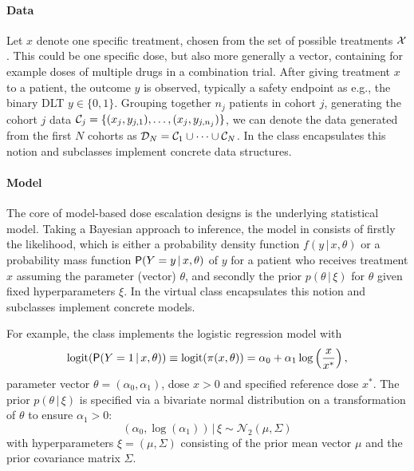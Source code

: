 \documentclass[article]{jss}\usepackage[]{graphicx}\usepackage[]{color}
\newcommand{\given}{\,\vert\,}
\begin{document}
\paragraph{Data}
\label{sec:frame:data}
%
Let $x$ denote one specific treatment, chosen from the set
of possible treatments ${\cal X}$. This could be one specific dose, but also
more generally a vector, containing for example doses of multiple drugs in a
combination trial. After giving treatment $x$ to a patient, the outcome $y$
is observed, typically a safety endpoint as e.g., the binary DLT $y \in \{0,
1\}$. Grouping together $n_{j}$ patients in cohort $j$, generating the cohort
$j$ data ${\cal C}_{j} = \{(x_{j}, y_{j,1}), \dotsc, (x_{j},
y_{j,n_{j}})\}$, we can denote the data generated from the first $N$ cohorts as
${\cal D}_{N}= {\cal C}_{1} \cup \dotsb \cup {\cal C}_{N}$.
%
In  the  class  encapsulates this
notion and subclasses implement concrete data structures.

\paragraph{Model}
\label{sec:frame:model}
%
The core of model-based dose escalation designs is the underlying statistical model. Taking a
Bayesian approach to inference, the model in  consists of firstly the
likelihood, which is either a probability density function $f(y \given x,
\theta)$ or a probability mass function $\Prob(Y=y \given x, \theta)$ of $y$ for
a patient who receives treatment $x$ assuming the parameter (vector) $\theta$,
and secondly the prior $p(\theta \given \xi)$ for $\theta$ given fixed
hyperparameters $\xi$.
%
In  the virtual  class  encapsulates this
notion and subclasses implement concrete models.

For example, the class  implements
the logistic regression model \citep{Neuenschwander2008} with
\begin{equation}
\label{eq:LogisticLogNormal}
\mathrm{logit}(\Prob(Y=1 \given x,\theta))
\equiv \mathrm{logit}(\pi(x,\theta))
= \alpha_{0} + \alpha_{1} \log\left(\frac{x}{x^*}\right),
\end{equation}
parameter vector $\theta = (\alpha_{0},\alpha_{1})$, dose $x > 0$ and specified
reference dose $x^{*}$. The prior $p(\theta \given \xi)$ is specified
via a bivariate normal distribution on a transformation of $\theta$ to ensure
$\alpha_{1} > 0$:
\begin{equation}
  \label{eq:bivariateNormal}
  (\alpha_{0}, \log(\alpha_{1})) \given \xi \sim \mathcal{N}_{2} (\mu, \Sigma)
\end{equation}
with hyperparameters $\xi = (\mu, \Sigma)$ consisting of the prior mean vector
$\mu$ and the prior covariance matrix $\Sigma$.
\end{document}
